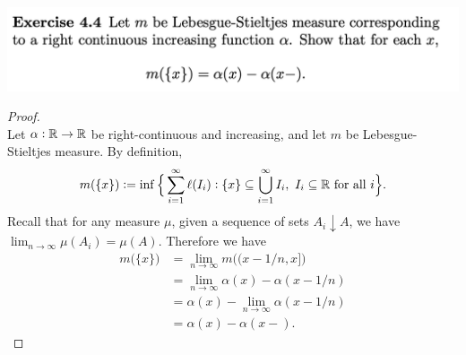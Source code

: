 \newpage
\begin{mdframed}
\includegraphics[width=400pt]{img/analysis--berkeley-202a-hw04-c0b6.png}
\end{mdframed}

\begin{proof}~\\
  Let $\alpha: \mathbb{R} \to \mathbb{R}$ be right-continuous and increasing, and let $m$ be Lebesgue-Stieltjes measure. By
  definition,
  \begin{align*}
    m(\{x\}) := \inf \Big\{\sum_{i=1}^\infty \ell(I_i) : \{x\} \subseteq \bigcup_{i=1}^\infty I_i, ~ I_i \subseteq \mathbb{R} \text{~for all~}i\Big\}.
  \end{align*}
  Recall that for any measure $\mu$, given a sequence of sets $A_i \downarrow A$, we
  have $\lim_{n\to\infty} \mu(A_i) = \mu(A)$. Therefore we have
  \begin{align*}
    m\big(\{x\}\big)
    &= \lim_{n\to\infty} m\big((x - 1/n, x]\big) \\
    &= \lim_{n\to\infty} \alpha(x) - \alpha(x - 1/n) \\
    &= \alpha(x) - \lim_{n\to\infty} \alpha(x - 1/n) \\
    &= \alpha(x) - \alpha(x-).
  \end{align*}
\end{proof}




